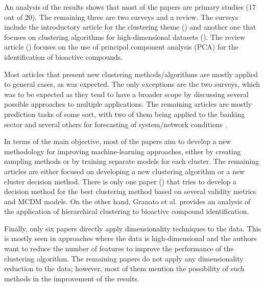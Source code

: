 An analysis of the results shows that most of the papers are primary studies (17 out of 20). The remaining three are two surveys and a review. The surveys include the introductory article for the clustering theme (\cite{Jain_Dataclustering50_2010}) and another one that focuses on clustering algorithms for high-dimensional datasets (\cite{Fahad.Alshatri.ea_SurveyClusteringAlgorithms_2014a}). The review article (\cite{Granato.Santos.ea_Useprincipalcomponent_2018}) focuses on the use of principal component analysis (PCA) for the identification of bioactive compounds.

Most articles that present new clustering methods/algorithms are mostly applied to general cases, as was expected. The only exceptions are the two surveys, which was to be expected as they tend to have a broader scope by discussing several possible approaches to multiple applications. The remaining articles are mostly prediction tasks of some sort, with two of them being applied to the banking sector \cite{Kou20141, Behera.Panigrahi_CreditCardFraud_2015} and several others for forecasting of system/network conditions \cite{Fahiman.Erfani.ea_Improvingloadforecasting_2017, Tang.Liu.ea_ImprovedFuzzyNeural_2017, Jahangir.Tayarani.ea_DeepLearningBasedForecasting_2021, Yang.Li.ea_BayesianDeepLearningBased_2020}.

In terms of the main objective, most of the papers aim to develop a new methodology for improving machine-learning approaches, either by creating sampling methods or by training separate models for each cluster. The remaining articles are either focused on developing a new clustering algorithm or a new cluster decision method. There is only one paper (\cite{Kou20141}) that tries to develop a decision method for the best clustering method based on several validity metrics and MCDM models. On the other hand, Granato et al. \cite{Granato.Santos.ea_Useprincipalcomponent_2018} provides an analysis of the application of hierarchical clustering to bioactive compound identification.

Finally, only six papers directly apply dimensionality techniques to the data. This is mostly seen in approaches where the data is high-dimensional and the authors want to reduce the number of features to improve the performance of the clustering algorithm. The remaining papers do not apply any dimensionality reduction to the data; however, most of them mention the possibility of such methods in the improvement of the results.


